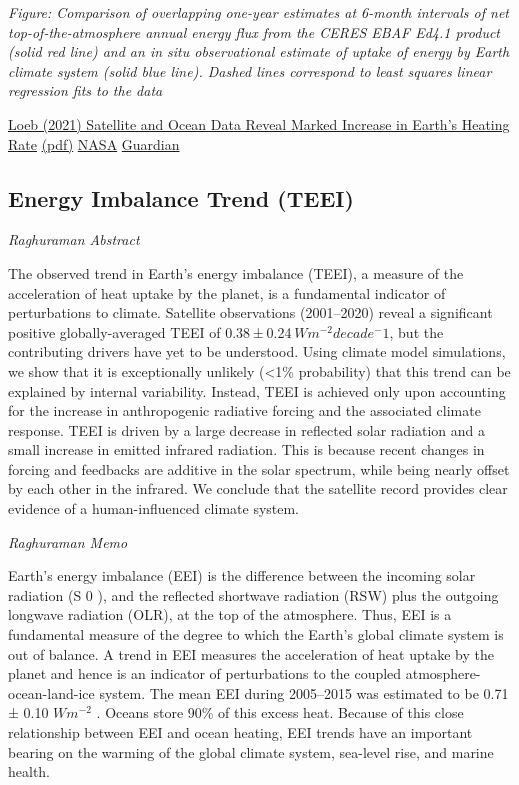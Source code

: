 \documentclass[
]{book}
\begin{document}
\emph{Figure: Comparison of overlapping one-year estimates at 6-month intervals of net top-of-the-atmosphere annual
energy flux from the CERES EBAF Ed4.1 product (solid red line) and an in situ observational estimate of uptake of
energy by Earth climate system (solid blue line). Dashed lines correspond to least squares linear regression fits to the data}

\href{https://agupubs.onlinelibrary.wiley.com/doi/10.1029/2021GL093047}{Loeb (2021) Satellite and Ocean Data Reveal Marked Increase in Earth's Heating Rate}
\href{pdf/Loeb_2021_Earths_Heating_Rate.pdf}{(pdf)}
\href{https://www.nasa.gov/feature/langley/joint-nasa-noaa-study-finds-earths-energy-imbalance-has-doubled}{NASA}
\href{https://www.theguardian.com/science/2021/jun/17/earth-trapping-heat-study-nasa-noaa}{Guardian}

\hypertarget{energy-imbalance-trend-teei}{%
\subsection{Energy Imbalance Trend (TEEI)}\label{energy-imbalance-trend-teei}}

\emph{Raghuraman Abstract}

The observed trend in Earth's energy imbalance (TEEI), a measure of the acceleration of heat uptake by the planet, is a fundamental indicator of perturbations to climate. Satellite observations (2001--2020) reveal a significant positive globally-averaged TEEI of 0.38 ± 0.24 \(Wm^{-2} decade^-1\), but the contributing drivers have yet to be understood. Using climate model simulations, we show that it is exceptionally unlikely (\textless1\% probability) that this trend can be explained by internal variability. Instead, TEEI is achieved only upon accounting for the increase in anthropogenic radiative forcing and the associated climate response. TEEI is driven by a large decrease in reflected solar radiation and a small increase in emitted infrared radiation. This is because recent changes in forcing and feedbacks are additive in the solar spectrum, while being nearly offset by each other in the infrared. We conclude that the satellite record provides clear evidence of a human-influenced climate system.

\emph{Raghuraman Memo}

Earth's energy imbalance (EEI) is the difference between the
incoming solar radiation (S 0 ), and the reflected shortwave
radiation (RSW) plus the outgoing longwave radiation
(OLR), at the top of the atmosphere. Thus, EEI is a fundamental
measure of the degree to which the Earth's global climate
system is out of balance. A trend in EEI measures the acceleration
of heat uptake by the planet and hence is an indicator of perturbations
to the coupled atmosphere-ocean-land-ice system.
The mean EEI during 2005--2015 was estimated to be
0.71 ± 0.10 \(Wm^{-2}\) . Oceans store 90\% of this excess heat. Because
of this close relationship between EEI and ocean heating, EEI
trends have an important bearing on the warming of the global
climate system, sea-level rise, and marine health.
\end{document}
